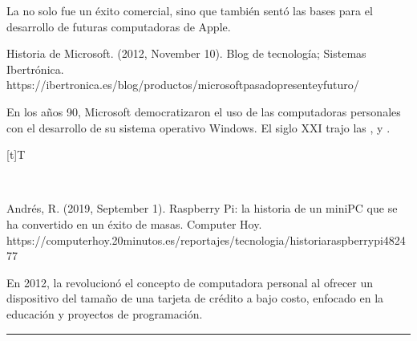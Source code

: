 \documentclass[letterpaper,10pt,spanish]{sphinxmanual}
\let\sphinxpxdimen\pdfpxdimen\else\newdimen\sphinxpxdimen
\begin{document}
\sphinxAtStartPar
La  no solo fue un éxito comercial, sino que también sentó las bases para el desarrollo de futuras computadoras de Apple.

\sphinxAtStartPar
%
\begin{footnote}[8]\sphinxAtStartFootnote
Historia de Microsoft. (2012, November 10). Blog de tecnología; Sistemas Ibertrónica. https://ibertronica.es/blog/productos/microsoft\sphinxhyphen{}pasado\sphinxhyphen{}presente\sphinxhyphen{}y\sphinxhyphen{}futuro/
%
\end{footnote} En los años 90, Microsoft democratizaron el uso de las computadoras personales con el desarrollo de su sistema operativo Windows. El siglo XXI trajo las ,  y .


\begin{savenotes}\sphinxattablestart
\sphinxthistablewithglobalstyle
\centering
\begin{tabulary}{\linewidth}[t]{T}
\sphinxtoprule
\sphinxtableatstartofbodyhook

\begin{sphinxfigure-in-table}
\centering
\capstart
\noindent\sphinxincludegraphics[width=500\sphinxpxdimen]{{image06}.png}
\label{\detokenize{1_guias/10informatica/G1001:id31}}\end{sphinxfigure-in-table}\relax
\\
\sphinxbottomrule
\end{tabulary}
\sphinxtableafterendhook\par
\sphinxattableend\end{savenotes}

\sphinxAtStartPar
%
\begin{footnote}[9]\sphinxAtStartFootnote
Andrés, R. (2019, September 1). Raspberry Pi: la historia de un mini\sphinxhyphen{}PC que se ha convertido en un éxito de masas. Computer Hoy. https://computerhoy.20minutos.es/reportajes/tecnologia/historia\sphinxhyphen{}raspberry\sphinxhyphen{}pi\sphinxhyphen{}482477
%
\end{footnote} En 2012, la  revolucionó el concepto de computadora personal al ofrecer un dispositivo del tamaño de una tarjeta de crédito a bajo costo, enfocado en la educación y proyectos de programación.


\bigskip\hrule\bigskip
\end{document}
